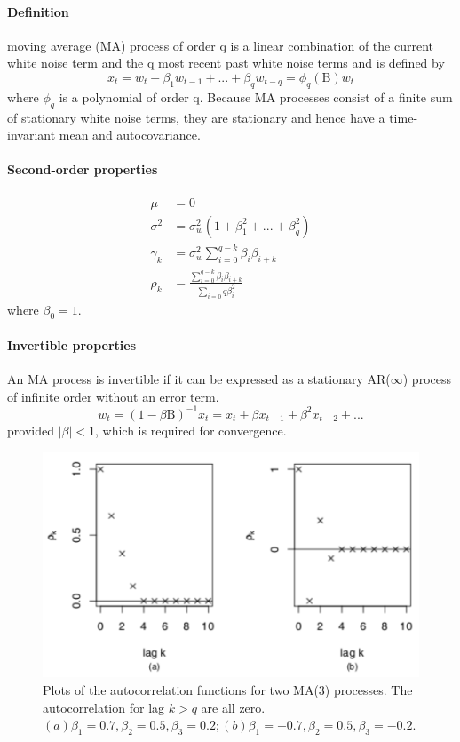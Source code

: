 \paragraph{Definition}
 moving average (MA) process of order q is a linear combination of the current white noise term and the q most recent past white noise terms and is defined by
\[ x_t = w_t + \beta_1 w_{t-1} + ... + \beta_q w_{t-q} = \phi_q(\mathrm{B}) w_t \]
where $\phi_q$ is a polynomial of order q. Because MA processes consist of a finite sum of stationary white noise terms, they are stationary and hence have a time-invariant mean and autocovariance.

\paragraph{Second-order properties}
\begin{align*}
    \mu &= 0 \\
    \sigma^2 &= \sigma_w^2 (1 + \beta_1^2 + ... + \beta_q^2) \\
    \gamma_k &= \sigma_w^2 \sum_{i=0}^{q-k} \beta_i \beta_{i+k} \\
    \rho_k &= \frac{\sum_{i=0}^{q-k} \beta_i \beta_{i+k}}{\sum_{i=0}{q} \beta_i^2 }
\end{align*}
where $\beta_0 = 1$.

\paragraph{Invertible properties}
An MA process is invertible if it can be expressed as a stationary AR($\infty$) process of infinite order without an error term.
\[ w_t = (1 - \beta \mathrm{B})^{-1} x_t = x_t + \beta x_{t-1} + \beta^2 x_{t-2} + ... \]
provided $|\beta| < 1$, which is required for convergence.

\begin{figure}[!ht]
    \centering
    \includegraphics[scale=0.7]{src/SerieChronologique/MA-Correlogram.png}
    \caption{Plots of the autocorrelation functions for two MA(3) processes. The autocorrelation for lag $k>q$ are all zero. $(a) \beta_1 = 0.7, \beta_2 = 0.5, \beta_3 = 0.2; (b) \beta_1 = -0.7, \beta_2 = 0.5, \beta_3 = -0.2$.}
\end{figure}

